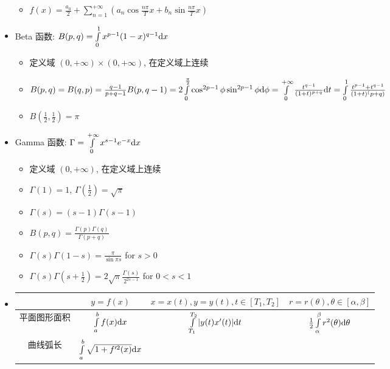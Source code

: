 \documentclass[landscape, twocolumn, 8pt, a4paper, twoside]{extarticle}
\begin{document}
\begin{itemize}
\begin{itemize}
      \item $f(x) = \frac{a_0}{2} +
              \sum\limits_{n = 1}^{+\infty}(a_n \cos \frac{n\pi}{T} x + b_n \sin \frac{n\pi}{T}x)$
      \end{itemize}
    \item Beta 函数: $B(p, q) = \int\limits_{0}^{1} x^{p - 1} (1 - x) ^ {q - 1} {\rm d}x$
      \begin{itemize}
      \item 定义域 $(0, +\infty) \times (0, +\infty)$, 在定义域上连续
      \item $B(p, q) = B(q, p) = \frac{q - 1}{p + q - 1} B(p, q - 1)
                     = 2\int\limits_{0}^{\frac{\pi}{2}} \cos^{2p - 1}\phi \sin^{2p - 1} \phi {\rm d}\phi
                     = \int\limits_{0}^{+\infty} \frac{t^{q - 1}}{(1 + t)^{p + q}} {\rm d}t
                     = \int\limits_{0}^{1} \frac{t^{p - 1} + t ^ {q - 1}}{(1 + t) ^ (p + q)}$
      \item $B(\frac{1}{2}, \frac{1}{2}) = \pi$
      \end{itemize}
    \item Gamma 函数: $\Gamma = \int\limits_{0}^{+\infty} x^{s - 1} e ^ {-x} {\rm d}x$
      \begin{itemize}
      \item 定义域 $(0, +\infty)$, 在定义域上连续
      \item $\Gamma(1) = 1$, $\Gamma(\frac{1}{2}) = \sqrt{\pi}$
      \item $\Gamma(s) = (s - 1) \Gamma(s - 1)$
      \item $B(p, q) = \frac{\Gamma(p)\Gamma(q)}{\Gamma(p + q)}$
      \item $\Gamma(s)\Gamma(1 - s) = \frac{\pi}{\sin \pi s}$ for $s > 0$
      \item $\Gamma(s)\Gamma(s + \frac{1}{2}) = 2\sqrt{\pi} \frac{\Gamma(s)}{2^{2s - 1}}$ for $0 < s < 1$
      \end{itemize}
    \item
      \begin{tabular}{|c|c|c|c|}
      \hline
         & $y = f(x)$ & $x = x(t), y = y(t), t \in [T_1, T_2]$ & $r = r(\theta), \theta \in [\alpha, \beta]$\\
      \hline
      平面图形面积
      & $\int\limits_{a}^{b}f(x){\rm d}x$
      & $\int\limits_{T_1}^{T_2} | y(t) x^\prime(t) | {\rm d}t$
      & $\frac{1}{2}\int\limits_{\alpha}^{\beta}r^2(\theta) {\rm d}\theta $ \\
      \hline
      曲线弧长
      & $\int\limits_{a}^{b} \sqrt{1 + f^{\prime 2}(x)} {\rm d}x$

\end{tabular}
\end{itemize}
\end{document}
